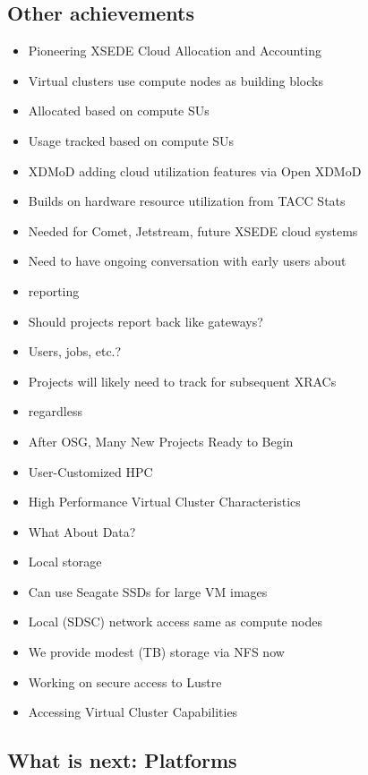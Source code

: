 \subsection{Other achievements}
\begin{itemize}
\item Pioneering XSEDE Cloud Allocation and Accounting
\item Virtual clusters use compute nodes as building blocks
\item Allocated based on compute SUs
\item Usage tracked based on compute SUs
\item XDMoD adding cloud utilization features via Open XDMoD
\item Builds on hardware resource utilization from TACC Stats
\item Needed for Comet, Jetstream, future XSEDE cloud systems
\item Need to have ongoing conversation with early users about \item reporting
\item Should projects report back like gateways?
\item Users, jobs, etc.?
\item Projects will likely need to track for subsequent XRACs \item regardless
\item After OSG, Many New Projects Ready to Begin
\item User-Customized HPC
\item High Performance Virtual Cluster Characteristics
\item What About Data?
\item Local storage
\item Can use Seagate SSDs for large VM images
\item Local (SDSC) network access same as compute nodes
\item We provide modest (TB) storage via NFS now
\item Working on secure access to Lustre
\item Accessing Virtual Cluster Capabilities
\end{itemize}



\subsection{What is next: Platforms}

